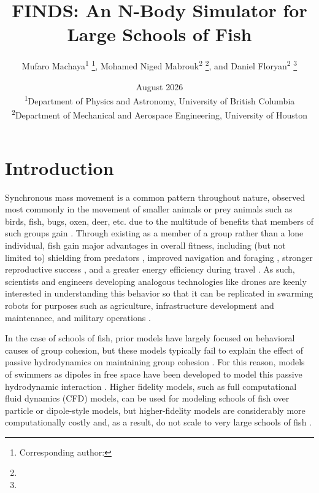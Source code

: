 \documentclass[letterpaper, 10pt, twoside]{LTJournalArticle}
\title{FINDS: An N-Body Simulator for Large Schools of Fish}
\author{
  Mufaro Machaya\textsuperscript{1}
  \thanks{Corresponding author: \email{mufaro2@student.ubc.ca}},
  Mohamed Niged Mabrouk\textsuperscript{2}
  \thanks{\email{mmabrouk@uh.edu}}, and
  Daniel Floryan\textsuperscript{2}
  \thanks{\email{dfloryan@uh.edu}} \\
}
\date{
  August 2026 \vspace{1em} \\
  \footnotesize\textsuperscript{1}Department of Physics and Astronomy, University of British Columbia \\
  \footnotesize\textsuperscript{2}Department of Mechanical and Aerospace Engineering, University of Houston
}
\begin{document}
\maketitle

\section{Introduction}

Synchronous mass movement is a common pattern throughout nature, observed
most commonly in the movement of smaller animals or prey animals such as birds,
fish, bugs, oxen, deer, etc. due to the multitude of benefits that members of
such groups gain \cite{parrish_hamner_prewitt_1997, vicsek_zafeiris_2012}.
Through existing as a member of a group rather than a lone individual, fish
gain major advantages in overall fitness, including (but not limited to)
shielding from predators \cite{major_1978, shaw_1978, landeau_terborgh_1986},
improved navigation and foraging \cite{colvert_chen_kanso_2017, pitcher_1982},
stronger reproductive success \cite{barnes_hughes_2009}, and a greater energy
efficiency during travel \cite{weihs_1973}. As such, scientists and engineers
developing analogous technologies like drones are keenly interested in
understanding this behavior so that it can be replicated in swarming robots for
purposes such as agriculture, infrastructure development and maintenance, and
military operations \cite{dorigo_theraulaz_trianni_2020}.

In the case of schools of fish, prior models have largely focused on behavioral
causes of group cohesion, but these models typically fail to explain the effect
of passive hydrodynamics on maintaining group cohesion
\cite{boids_reynolds_1987, couzin_2005}. For this reason, models of swimmers as
dipoles in free space have been developed to model this passive hydrodynamic
interaction \cite{mabrouk_floryan_2024, mabrouk_floryan_2025, tchieu_et_al_2012}.
Higher fidelity models, such as full computational fluid dynamics (CFD) models,
can be used for modeling schools of fish over particle or dipole-style models,
but higher-fidelity models are considerably more computationally costly and, 
as a result, do not scale to very large schools of fish
\cite{verma_et_al_2018,ligman_lund_furth_2024}.
\end{document}
